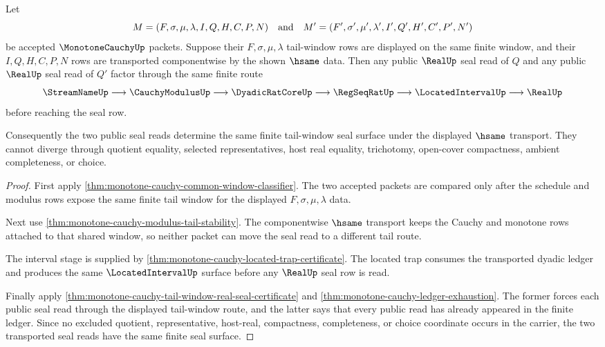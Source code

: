 \begin{theorem}
\label{thm:monotone-cauchy-public-seal-window-determinacy}
Let
$$
M=(F,\sigma,\mu,\lambda,I,Q,H,C,P,N)
\quad\hbox{and}\quad
M'=(F',\sigma',\mu',\lambda',I',Q',H',C',P',N')
$$
be accepted $\MonotoneCauchyUp$ packets. Suppose their $F,\sigma,\mu,\lambda$ tail-window rows are displayed on the same finite window, and their $I,Q,H,C,P,N$ rows are transported componentwise by the shown $\hsame$ data. Then any public $\RealUp$ seal read of $Q$ and any public $\RealUp$ seal read of $Q'$ factor through the same finite route
$$
\StreamNameUp
\longrightarrow
\CauchyModulusUp
\longrightarrow
\DyadicRatCoreUp
\longrightarrow
\RegSeqRatUp
\longrightarrow
\LocatedIntervalUp
\longrightarrow
\RealUp
$$
before reaching the seal row.

Consequently the two public seal reads determine the same finite tail-window seal surface under the displayed $\hsame$ transport. They cannot diverge through quotient equality, selected representatives, host real equality, trichotomy, open-cover compactness, ambient completeness, or choice.
\end{theorem}
\begin{proof}
First apply \autoref{thm:monotone-cauchy-common-window-classifier}. The two accepted packets are compared only after the schedule and modulus rows expose the same finite tail window for the displayed $F,\sigma,\mu,\lambda$ data.

Next use \autoref{thm:monotone-cauchy-modulus-tail-stability}. The componentwise $\hsame$ transport keeps the Cauchy and monotone rows attached to that shared window, so neither packet can move the seal read to a different tail route.

The interval stage is supplied by \autoref{thm:monotone-cauchy-located-trap-certificate}. The located trap consumes the transported dyadic ledger and produces the same $\LocatedIntervalUp$ surface before any $\RealUp$ seal row is read.

Finally apply \autoref{thm:monotone-cauchy-tail-window-real-seal-certificate} and \autoref{thm:monotone-cauchy-ledger-exhaustion}. The former forces each public seal read through the displayed tail-window route, and the latter says that every public read has already appeared in the finite ledger. Since no excluded quotient, representative, host-real, compactness, completeness, or choice coordinate occurs in the carrier, the two transported seal reads have the same finite seal surface.
\end{proof}

